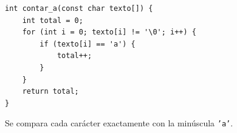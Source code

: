 \begin{enumerate}[label=\textbf{\arabic*.}]
\ifpauta\begin{solucionbox}\begin{lstlisting}[style=customc]
int contar_a(const char texto[]) {
    int total = 0;
    for (int i = 0; texto[i] != '\0'; i++) {
        if (texto[i] == 'a') {
            total++;
        }
    }
    return total;
}
\end{lstlisting}Se compara cada carácter exactamente con la minúscula \texttt{'a'}.\end{solucionbox}\else\vspace{3cm}\fi
\end{enumerate}

